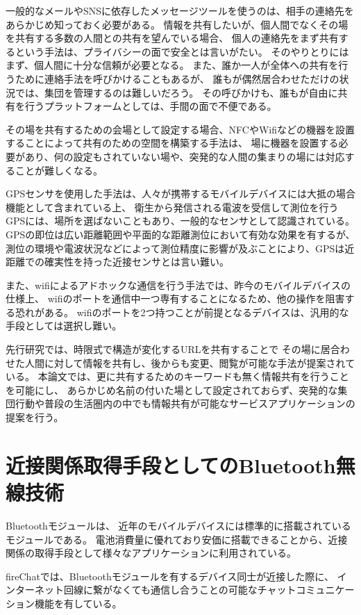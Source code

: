一般的なメールやSNSに依存したメッセージツールを使うのは、相手の連絡先をあらかじめ知っておく必要がある。
情報を共有したいが、個人間でなくその場を共有する多数の人間との共有を望んでいる場合、
個人の連絡先をまず共有するという手法は、プライバシーの面で安全とは言いがたい。
そのやりとりにはまず、個人間に十分な信頼が必要となる。
また、誰か一人が全体への共有を行うために連絡手法を呼びかけることもあるが、
誰もが偶然居合わせただけの状況では、集団を管理するのは難しいだろう。
その呼びかけも、誰もが自由に共有を行うプラットフォームとしては、手間の面で不便である。

その場を共有するための会場として設定する場合、NFCやWifiなどの機器を設置することによって共有のための空間を構築する手法は、
場に機器を設置する必要があり、何の設定もされていない場や、突発的な人間の集まりの場には対応することが難しくなる。

GPSセンサを使用した手法は、人々が携帯するモバイルデバイスには大抵の場合機能として含まれている上、
衛生から発信される電波を受信して測位を行うGPSには、場所を選ばないこともあり、一般的なセンサとして認識されている。
GPSの即位は広い距離範囲や平面的な距離測位において有効な効果を有するが、
測位の環境や電波状況などによって測位精度に影響が及ぶことにより、GPSは近距離での確実性を持った近接センサとは言い難い。

また、wifiによるアドホックな通信を行う手法では、昨今のモバイルデバイスの仕様上、
wifiのポートを通信中一つ専有することになるため、他の操作を阻害する恐れがある。
wifiのポートを2つ持つことが前提となるデバイスは、汎用的な手段としては選択し難い。

先行研究\cite{山本伶:2013-03-06}では、時限式で構造が変化するURLを共有することで
その場に居合わせた人間に対して情報を共有し、後からも変更、閲覧が可能な手法が提案されている。
本論文では、更に共有するためのキーワードも無く情報共有を行うことを可能にし、
あらかじめ名前の付いた場として設定されておらず、突発的な集団行動や普段の生活圏内の中でも情報共有が可能なサービスアプリケーションの提案を行う。


\section{近接関係取得手段としてのBluetooth無線技術}

Bluetooth\cite{bluetooth}モジュールは、
近年のモバイルデバイスには標準的に搭載されているモジュールである。
電池消費量に優れており安価に搭載できることから、近接関係の取得手段として様々なアプリケーションに利用されている。

fireChat\cite{firechat}では、Bluetoothモジュールを有するデバイス同士が近接した際に、
インターネット回線に繋がなくても通信し合うことの可能なチャットコミュニケーション機能を有している。

